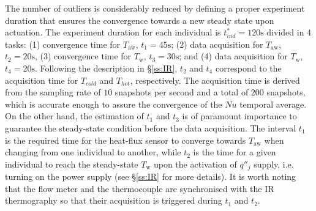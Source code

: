 The number of outliers is considerably reduced by defining a proper experiment duration that ensures the convergence towards a new steady state upon actuation. The experiment duration for each individual is $t^*_{ind} = 120\mathrm{s}$ divided in 4 tasks: (1) convergence time for $T_\mathrm{aw}$, $t_1 = 45\mathrm{s}$; (2) data acquisition for $T_\mathrm{aw}$, $t_2 = 20\mathrm{s}$, (3) convergence time for $T_\mathrm{w}$, $t_3 = 30\mathrm{s}$; and (4) data acquisition for $T_\mathrm{w}$, $t_4 = 20\mathrm{s}$. Following the description in \S\ref{ss:IR}, $t_2$ and $t_4$ correspond to the acquisition time for $T_{cold}$ and $T_{hot}$, respectively. The acquisition time is derived from the sampling rate of $10$ snapshots per second and a total of $200$ snapshots, which is accurate enough to assure the convergence of the $\overline{Nu}$ temporal average. On the other hand, the estimation of $t_1$ and $t_3$ is of paramount importance to guarantee the steady-state condition before the data acquisition. The interval $t_1$ is the required time for the heat-flux sensor to converge towards $T_\mathrm{aw}$ when changing from one individual to another, while $t_2$ is the time for a given individual to reach the steady-state $T_\mathrm{w}$ upon the activation of $q''_j$ supply, i.e. turning on the power supply (see \S\ref{ss:IR} for more details). It is worth noting that the flow meter and the thermocouple are synchronised with the IR thermography so that their acquisition is triggered during $t_1$ and $t_2$.

